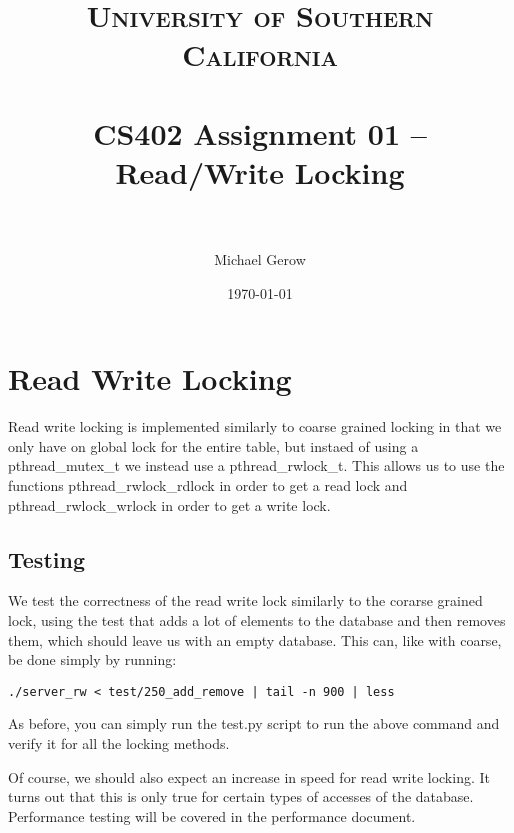 \documentclass[paper=a4, fontsize=11pt]{scrartcl} %
\title{	
\normalfont \normalsize 
\textsc{University of Southern California} \\ [25pt] %
\horrule{0.5pt} \\[0.4cm] %
\huge CS402 Assignment 01 -- Read/Write Locking \\ %
\horrule{2pt} \\[0.5cm] %
}
\author{Michael Gerow} %
\date{\normalsize\today} %
\numberwithin{equation}{section} %
\numberwithin{figure}{section} %
\numberwithin{table}{section} %
\begin{document}
\maketitle %


\section{Read Write Locking}
Read write locking is implemented similarly to coarse grained locking in that we only have on global lock for the entire table, but instaed of using a pthread\_mutex\_t we instead use a pthread\_rwlock\_t. This allows us to use the functions pthread\_rwlock\_rdlock in order to get a read lock and pthread\_rwlock\_wrlock in order to get a write lock.

\subsection{Testing}
We test the correctness of the read write lock similarly to the corarse grained lock, using the test that adds a lot of elements to the database and then removes them, which should leave us with an empty database. This can, like with coarse, be done simply by running:

\begin{verbatim}
./server_rw < test/250_add_remove | tail -n 900 | less
\end{verbatim}

As before, you can simply run the test.py script to run the above command and verify it for all the locking methods.

Of course, we should also expect an increase in speed for read write locking.  It turns out that this is only true for certain types of accesses of the database. Performance testing will be covered in the performance document.
\end{document}
